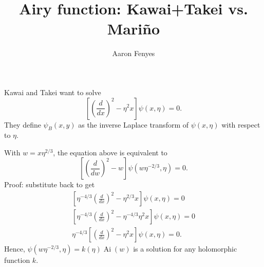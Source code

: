 \documentclass{article}
\title{Airy function: Kawai+Takei vs. Mari\~{n}o}
\author{Aaron Fenyes}
\theoremstyle{definition}
\theoremstyle{plain}
\DeclareMathOperator{\Ai}{Ai}
\begin{document}
\maketitle
Kawai and Takei want to solve
\[ \left[\left(\frac{d}{dx}\right)^2 - \eta^2 x \right] \psi(x, \eta) = 0. \]
They define $\psi_B(x, y)$ as the inverse Laplace transform of $\psi(x, \eta)$ with respect to $\eta$.

With $w = x \eta^{2/3}$, the equation above is equivalent to
\[ \left[\left(\frac{d}{dw}\right)^2 - w \right] \psi(w \eta^{-2/3}, \eta) = 0. \]
Proof: substitute back to get
\begin{align*}
\left[\eta^{-4/3} \left(\frac{d}{dx}\right)^2 - \eta^{2/3} x \right] \psi(x, \eta) = 0 \\
\left[\eta^{-4/3} \left(\frac{d}{dx}\right)^2 - \eta^{-4/3} \eta^2 x \right] \psi(x, \eta) = 0 \\
\eta^{-4/3} \left[\left(\frac{d}{dx}\right)^2 - \eta^2 x \right] \psi(x, \eta) = 0.
\end{align*}
Hence, $\psi(w \eta^{-2/3}, \eta) = k(\eta) \Ai(w)$ is a solution for any holomorphic function $k$.

%
%
%
\end{document}
